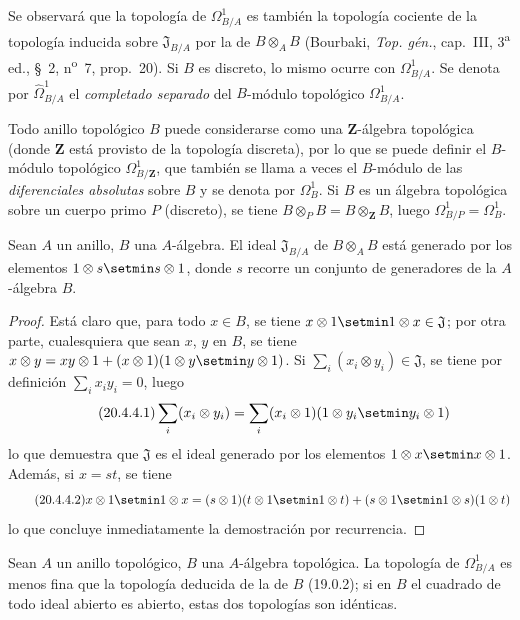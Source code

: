 Se observará que la topología de $\Omega^1_{B/A}$ es también la topología cociente
de la topología inducida sobre $\mathfrak{J}_{B/A}$ por la de
$B\otimes_A B$ (Bourbaki, \emph{Top. gén.}, cap.~III, 3\textsuperscript{a}
ed., §~2, n\textsuperscript{o}~7, prop.~20). Si $B$ es discreto, lo mismo ocurre
con $\Omega^1_{B/A}$. Se denota por $\widehat{\Omega}^1_{B/A}$ el
\emph{completado separado} del $B$-módulo topológico $\Omega^1_{B/A}$.

Todo anillo topológico $B$ puede considerarse como una
$\mathbf{Z}$-álgebra topológica (donde $\mathbf{Z}$ está provisto de la topología
discreta), por lo que se puede definir el $B$-módulo topológico $\Omega^1_{B/\mathbf{Z}}$,
que también se llama a veces el $B$-módulo de las \emph{diferenciales absolutas}
sobre $B$ y se denota por $\Omega^1_B$. Si $B$ es un álgebra topológica sobre
un cuerpo primo $P$ (discreto), se tiene
$B\otimes_P B=B\otimes_{\mathbf{Z}}B$, luego
$\Omega^1_{B/P}=\Omega^1_B$.

\begin{lemma}[20.4.4]
\label{0.20.4.4-fr}
Sean $A$ un anillo, $B$ una $A$-álgebra. El ideal $\mathfrak{J}_{B/A}$ de
$B\otimes_A B$ está generado por los elementos $1\otimes s\setmin s\otimes1$, donde $s$
recorre un conjunto de generadores de la $A$-álgebra $B$.
\end{lemma}

\begin{proof}
Está claro que, para todo $x\in B$, se tiene
$x\otimes1\setmin 1\otimes x\in\mathfrak{J}$; por otra parte, cualesquiera que sean $x$,
$y$ en $B$, se tiene
$x\otimes y=xy\otimes1+(x\otimes1)(1\otimes y\setmin y\otimes1)$. Si
$\sum_i(x_i\otimes y_i)\in\mathfrak{J}$, se tiene por definición
$\sum_i x_i y_i=0$, luego
\begin{equation}
\tag{20.4.4.1}
\label{0.20.4.4.1-fr}
  \sum_i(x_i\otimes y_i)=
  \sum_i(x_i\otimes1)(1\otimes y_i\setmin y_i\otimes1)
\end{equation}
lo que demuestra que $\mathfrak{J}$ es el ideal generado por los elementos
$1\otimes x\setmin x\otimes1$. Además, si $x=st$, se tiene
\begin{equation}
\tag{20.4.4.2}
\label{0.20.4.4.2-fr}
  x\otimes1\setmin 1\otimes x=(s\otimes1)(t\otimes1\setmin 1\otimes t)
  +(s\otimes1\setmin 1\otimes s)(1\otimes t)
\end{equation}
lo que concluye inmediatamente la demostración por recurrencia.
\end{proof}

\begin{proposition}[20.4.5]
\label{0.20.4.5-fr}
Sean $A$ un anillo topológico, $B$ una $A$-álgebra topológica. La
topología de $\Omega^1_{B/A}$ es menos fina que la topología deducida de la
de $B$ (19.0.2); si en $B$ el cuadrado de todo ideal abierto es abierto, estas
dos topologías son idénticas.
\end{proposition}

